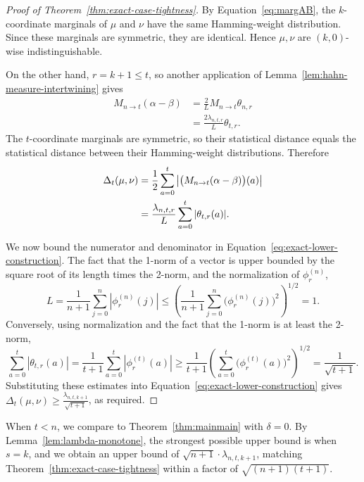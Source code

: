 \documentclass[manuscript,nonacm]{acmart}
\begin{document}
\begin{proof}[Proof of Theorem~\ref{thm:exact-case-tightness}]
By Equation~\ref{eq:margAB}, the \(k\)-coordinate marginals of \(\mu\) and \(\nu\) have the
same Hamming-weight distribution. Since these marginals are symmetric,
they are identical. Hence \(\mu,\nu\) are
\((k,0)\)-wise indistinguishable.

On the other hand, \(r=k+1\le t\), so another application of
Lemma~\ref{lem:hahn-measure-intertwining} gives
\[
\begin{aligned}
    M_{n\to t}(\alpha-\beta)
    &=
    \frac{2}{L}
    M_{n\to t}\theta_{n,r} \\
    &=
    \frac{2\lambda_{n,t,r}}{L}
    \theta_{t,r}.
\end{aligned}
\]
The \(t\)-coordinate marginals are symmetric, so their statistical
distance equals the statistical distance between their Hamming-weight
distributions. Therefore
\begin{align}
    \Delta_t(\mu,\nu)
    &=
    \frac12
    \sum_{a=0}^t
    \left|
        \bigl(M_{n\to t}(\alpha-\beta)\bigr)(a)
    \right| \notag\\
    &=
    \frac{\lambda_{n,t,r}}{L}
    \sum_{a=0}^t
    |\theta_{t,r}(a)|.
    \label{eq:exact-lower-construction}
\end{align}

We now bound the numerator and denominator in
Equation~\eqref{eq:exact-lower-construction}. The fact that the 1-norm of a vector is upper bounded by the square root of its length times the 2-norm, and the
normalization of \(\phi_r^{(n)}\),
\[
L=\frac{1}{n+1}\sum_{j=0}^n|\phi_r^{(n)}(j)|\le
    \left(
        \frac{1}{n+1}
        \sum_{j=0}^n
        \bigl(\phi_r^{(n)}(j)\bigr)^2
    \right)^{1/2}=1.
\]
Conversely, using normalization and the fact that the 1-norm is at least the 2-norm,
\[
    \sum_{a=0}^t
    |\theta_{t,r}(a)|
    =
    \frac{1}{t+1}
    \sum_{a=0}^t
    |\phi_r^{(t)}(a)| 
    \ge
    \frac{1}{t+1}
    \left(
        \sum_{a=0}^t
        \bigl(\phi_r^{(t)}(a)\bigr)^2
    \right)^{1/2} 
    =
    \frac{1}{\sqrt{t+1}}.
\]
Substituting these estimates into
Equation~\eqref{eq:exact-lower-construction} gives $\Delta_t(\mu,\nu)\ge\frac{\lambda_{n,t,k+1}}{\sqrt{t+1}}$,
as required.
\end{proof}

When \(t<n\), we compare to Theorem~\ref{thm:mainmain} with
\(\delta=0\). By Lemma~\ref{lem:lambda-monotone}, the strongest possible upper bound is when $s=k$, and we obtain an upper bound of $\sqrt{n+1}\cdot\lambda_{n,t,k+1}$, matching Theorem~\ref{thm:exact-case-tightness} within a factor of $\sqrt{(n+1)(t+1)}$.
\end{document}
